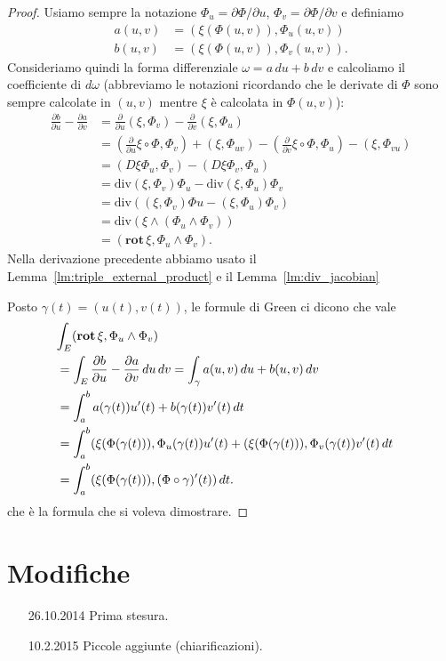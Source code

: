 \documentclass[italian,a4paper]{scrartcl}
\newcommand{\defeq}{=}
\renewcommand{\div}{\mathrm{div}}
\newcommand{\rot}{\mathbf{rot}\,}
\begin{document}
\begin{proof}
Usiamo sempre la notazione $\Phi_u = \partial \Phi/\partial u$,
$\Phi_v = \partial \Phi/\partial v$ e definiamo
\begin{align*}
a(u,v) &\defeq \left(\xi(\Phi(u,v)),\Phi_u(u,v)\right)\\
b(u,v) &\defeq \left(\xi(\Phi(u,v)),\Phi_v(u,v)\right).
\end{align*}
Consideriamo quindi la forma differenziale $\omega = a\, du + b\, dv$
e calcoliamo il coefficiente di $d\omega$ (abbreviamo le notazioni
ricordando che le derivate di $\Phi$ sono sempre calcolate in $(u,v)$
mentre $\xi$ è calcolata in $\Phi(u,v)$):
\begin{align*}
\frac{\partial b}{\partial u} - \frac{\partial a}{\partial v}
& = \frac{\partial}{\partial u}(\xi,\Phi_v) -\frac{\partial}{\partial
  v}(\xi,\Phi_u)\\
& = \left(\frac{\partial}{\partial u} \xi\circ \Phi, \Phi_v\right) +
  (\xi,\Phi_{uv}) - \left(\frac{\partial}{\partial v} \xi \circ \Phi,
  \Phi_u\right)
  -(\xi,\Phi_{vu})\\
& = (D\xi \Phi_u, \Phi_v)-(D\xi \Phi_v,\Phi_u)\\
& = \div (\xi,\Phi_v) \Phi_u - \div (\xi,\Phi_u) \Phi_v\\
& = \div ( (\xi,\Phi_v) \Phi u - (\xi,\Phi_u) \Phi_v)\\
& = \div (\xi \wedge (\Phi_u \wedge \Phi_v))\\
& = (\rot \xi, \Phi_u\wedge \Phi_v).
\end{align*}
Nella derivazione precedente abbiamo usato il
Lemma~\ref{lm:triple_external_product} e il Lemma~\ref{lm:div_jacobian}

Posto $\gamma(t) = (u(t),v(t))$,
le formule di Green ci dicono che vale
\begin{align*}
\lefteqn{\int_E (\rot \xi, \Phi_u \wedge \Phi_v)}\\
 & = \int_E  \frac{\partial b}{\partial u} - \frac{\partial
   a}{\partial v}\, du\,dv
  = \int_{\gamma} a(u,v)\, du + b(u,v)\, dv\\
 & = \int_a^b a(\gamma(t)) u'(t) + b(\gamma(t))v'(t) \, dt\\
 & = \int_a^b (\xi(\Phi(\gamma(t))), \Phi_u(\gamma(t)) u'(t)
     + (\xi(\Phi(\gamma(t))), \Phi_v(\gamma(t)) v'(t)\,
 dt \\
 & = \int_a^b (\xi(\Phi(\gamma(t))), (\Phi\circ\gamma)'(t))\, dt.
\end{align*}
che è la formula che si voleva dimostrare.
\end{proof}

\section*{Modifiche}
\begin{itemize}
\item[26.10.2014] Prima stesura.
\item[10.2.2015] Piccole aggiunte (chiarificazioni).
\end{itemize}
\end{document}
